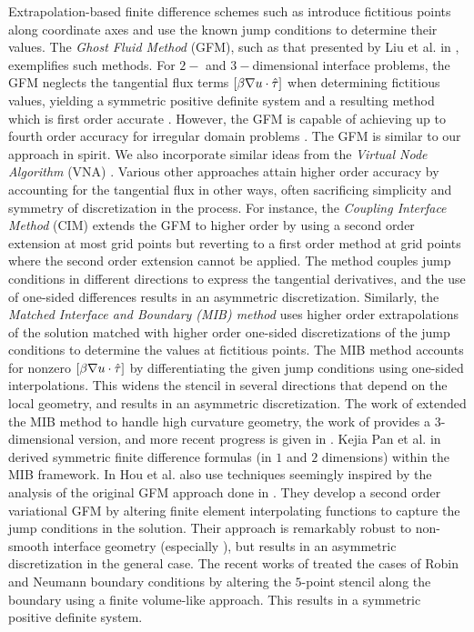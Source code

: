 Extrapolation-based finite difference schemes such as \cite{Liu.Xu-Dong00, Gibou02, Zhou.YC06a, Gibou05, Jomaa05, Chern07} introduce fictitious points along coordinate axes and use the known jump conditions to determine their values. The \emph{Ghost Fluid Method} (GFM), such as that presented by Liu et al. in \cite{Liu.Xu-Dong00}, exemplifies such methods. For $2-$ and $3-$dimensional interface problems, the GFM neglects the tangential flux terms $\left[ \beta \nabla u \cdot \hat{\mathbf{\tau}} \right]$ when determining fictitious values, yielding a symmetric positive definite system and a resulting method which is first order accurate \cite{Liu.Xu-Dong00, Liu.Xu-Dong03}. However, the GFM is capable of achieving up to fourth order accuracy for irregular domain problems \cite{Gibou02, Gibou05}. The GFM is similar to our approach in spirit. We also incorporate similar ideas from the \emph{Virtual Node Algorithm} (VNA) \cite{Molino05, Bao.Zhaosheng07, Sifakis07}. Various other approaches attain higher order accuracy by accounting for the tangential flux in other ways, often sacrificing simplicity and symmetry of discretization in the process. For instance, the \emph{Coupling Interface Method} (CIM) \cite{Chern07} extends the GFM to higher order by using a second order extension at most grid points but reverting to a first order method at grid points where the second order extension cannot be applied. The method couples jump conditions in different directions to express the tangential derivatives, and the use of one-sided differences results in an asymmetric discretization. Similarly, the \emph{Matched Interface and Boundary \textnormal{(MIB)} method} \cite{Zhou.YC06a} uses higher order extrapolations of the solution matched with higher order one-sided discretizations of the jump conditions to determine the values at fictitious points. The MIB method accounts for nonzero $\left[ \beta \nabla u \cdot \hat{\mathbf{\tau}} \right]$ by differentiating the given jump conditions using one-sided interpolations. This widens the stencil in several directions that depend on the local geometry, and results in an asymmetric discretization. The work of \cite{Zhou.YC06b} extended the MIB method to handle high curvature geometry, the work of \cite{Yu.Sining07} provides a $3$-dimensional version, and more recent progress is given in \cite{Zhao.Shan09}. Kejia Pan et al. in \cite{Pan.Kejia10} derived symmetric finite difference formulas (in $1$ and $2$ dimensions) within the MIB framework. In \cite{Hou.Songming05,Hou.Songming10} Hou et al. also use techniques seemingly inspired by the analysis of the original GFM approach done in \cite{Liu.Xu-Dong00,Liu.Xu-Dong03}. They develop a second order variational GFM by altering finite element interpolating functions to capture the jump conditions in the solution. Their approach is remarkably robust to non-smooth interface geometry (especially \cite{Hou.Songming10}), but results in an asymmetric discretization in the general case. The recent works of \cite{Ng.YenTing09, Papac10} treated the cases of Robin and Neumann boundary conditions by altering the $5$-point stencil along the boundary using a finite volume-like approach. This results in a symmetric positive definite system.

